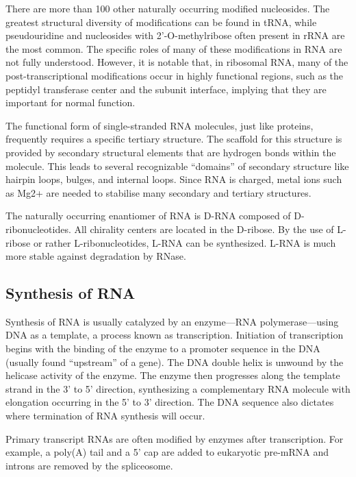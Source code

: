 There are more than 100 other naturally occurring modified nucleosides. The greatest structural diversity of modifications can be found in tRNA, while pseudouridine and nucleosides with 2'-O-methylribose often present in rRNA are the most common. The specific roles of many of these modifications in RNA are not fully understood. However, it is notable that, in ribosomal RNA, many of the post-transcriptional modifications occur in highly functional regions, such as the peptidyl transferase center and the subunit interface, implying that they are important for normal function.

The functional form of single-stranded RNA molecules, just like proteins, frequently requires a specific tertiary structure. The scaffold for this structure is provided by secondary structural elements that are hydrogen bonds within the molecule. This leads to several recognizable ``domains'' of secondary structure like hairpin loops, bulges, and internal loops. Since RNA is charged, metal ions such as Mg2+ are needed to stabilise many secondary and tertiary structures.

The naturally occurring enantiomer of RNA is D-RNA composed of D-ribonucleotides. All chirality centers are located in the D-ribose. By the use of L-ribose or rather L-ribonucleotides, L-RNA can be synthesized. L-RNA is much more stable against degradation by RNase.

\hypertarget{synthesis-of-rna}{%
\subsection{Synthesis of RNA}\label{synthesis-of-rna}}

Synthesis of RNA is usually catalyzed by an enzyme---RNA polymerase---using DNA as a template, a process known as transcription. Initiation of transcription begins with the binding of the enzyme to a promoter sequence in the DNA (usually found ``upstream'' of a gene). The DNA double helix is unwound by the helicase activity of the enzyme. The enzyme then progresses along the template strand in the 3' to 5' direction, synthesizing a complementary RNA molecule with elongation occurring in the 5' to 3' direction. The DNA sequence also dictates where termination of RNA synthesis will occur.

Primary transcript RNAs are often modified by enzymes after transcription. For example, a poly(A) tail and a 5' cap are added to eukaryotic pre-mRNA and introns are removed by the spliceosome.

